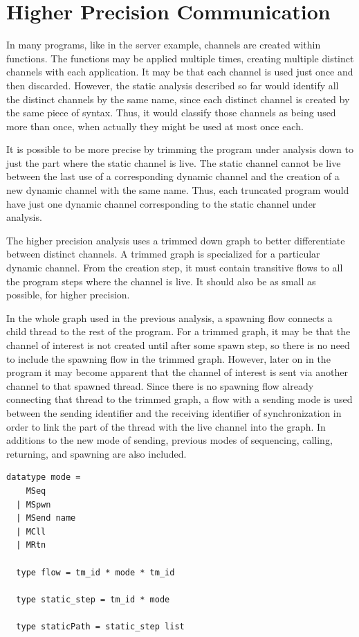 \documentclass[letterpaper, 11pt]{extarticle}
\begin{document}
\section{Higher Precision Communication} \label{high-precision}
In many programs, like in the server example, channels are created within functions.
The functions may be applied multiple times, creating multiple distinct channels
with each application. It may be that each channel is used just once and then discarded.
However, the static analysis described so far would identify all the distinct channels by the
same name, since each distinct channel is created by the same piece of syntax.
Thus, it would classify those channels as being used more than once,
when actually they might be used at most once each.

It is possible to be more precise by trimming the program under analysis down to just the part
where the static channel is live. The static channel cannot be live between the last use of a
corresponding dynamic channel and the creation of a new dynamic channel with the same name. Thus, each
truncated program would have just one dynamic channel corresponding to the static channel under
analysis. 

The higher precision analysis uses a trimmed down graph to better differentiate between distinct channels. 
A trimmed graph is specialized for a particular dynamic channel. From the creation
step, it must contain transitive flows to all the program steps where the
channel is live. It should also be as small as possible, for higher precision.

In the whole graph used in the previous analysis, a spawning flow
connects a child thread to the rest of the program. For a trimmed graph,
it may be that the channel of interest is not created until after some spawn step,
so there is no need to include the spawning flow in the trimmed graph. However, later on in the
program it may become apparent that the channel of interest is sent via another channel to
that spawned thread. Since there is no spawning flow already connecting that
thread to the trimmed graph, a flow with a sending mode is used between the
sending identifier and the receiving identifier of synchronization
in order to link the part of the thread with the live channel into the graph.
In additions to the new mode of sending, previous modes of
sequencing, calling, returning, and spawning are also included.

\begin{lstlisting}[language=logic, mathescape]
  datatype mode =
    MSeq
  | MSpwn
  | MSend name
  | MCll
  | MRtn

  type flow = tm_id * mode * tm_id

  type static_step = tm_id * mode

  type staticPath = static_step list
\end{lstlisting}
\end{document}
